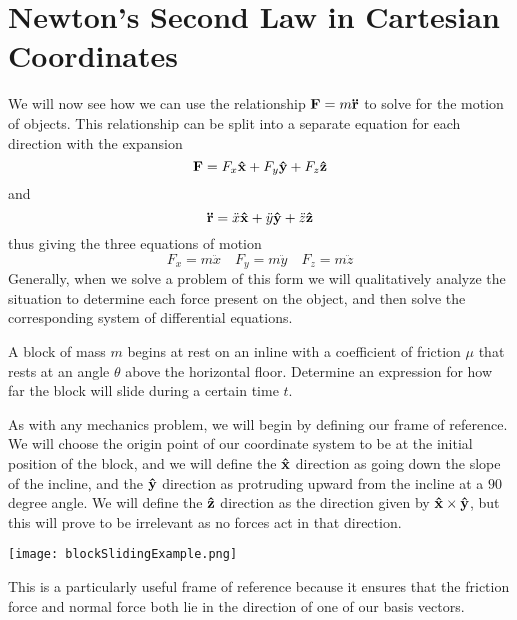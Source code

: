 \section{Newton's Second Law in Cartesian Coordinates}
We will now see how we can use the relationship $\mathbf{F} = m\mathbf{\ddot r}$ to solve for the motion of objects. This relationship can be split into a separate equation for each direction with the expansion
\[ \mathbf{F} = F_x\mathbf{\hat{x}} + F_y\mathbf{\hat{y}} + F_z\mathbf{\hat{z}} \]
and
\[ \mathbf{\ddot r} = \ddot x\mathbf{\hat{x}} + \ddot y\mathbf{\hat{y}} + \ddot z\mathbf{\hat{z}} \]
thus giving the three equations of motion
\[ F_x = m\ddot x \quad F_y = m\ddot y \quad F_z = m\ddot z \]
Generally, when we solve a problem of this form we will qualitatively analyze the situation to determine each force present on the object, and then solve the corresponding system of differential equations. 
\begin{example} \label{inclined}
    A block of mass $m$ begins at rest on an inline with a coefficient of friction $\mu$ that rests at an angle $\theta$ above the horizontal floor. Determine an expression for how far the block will slide during a certain time $t$.
    
    \begin{minipage}{0.48\textwidth}
        As with any mechanics problem, we will begin by defining our frame of reference. We will choose the origin point of our coordinate system to be at the initial position of the block, and we will define the $\mathbf{\hat{x}}$ direction as going down the slope of the incline, and the $\mathbf{\hat{y}}$ direction as protruding upward from the incline at a $90$ degree angle. We will define the $\mathbf{\hat{z}}$ direction as the direction given by $\mathbf{\hat{x}} \times \mathbf{\hat{y}}$, but this will prove to be irrelevant as no forces act in that direction.
    \end{minipage}
    \begin{minipage}{0.48\textwidth}
        \parbox{\textwidth}{
            \texttt{[image: blockSlidingExample.png]}
        }
    \end{minipage}
    
    This is a particularly useful frame of reference because it ensures that the friction force and normal force both lie in the direction of one of our basis vectors.


\end{example}
